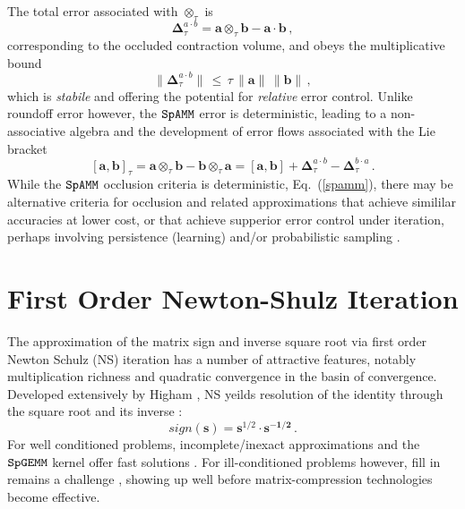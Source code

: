 \documentclass[letterpaper,twocolumn,amsmath,amsfont,amssymb,english,aps,jcp,preprintnumbers,groupaddress,nofootinbib,tightenlines]{revtex4}
\newcommand{\mat}[1]{\boldsymbol{#1}}
\newcommand{\ot}{ {\scriptstyle \otimes}_{ \tau } }
\begin{document}
The total error associated with $\ot$ is 
\begin{equation}
\mat{\Delta}^{a\cdot b}_{\tau}=\mat{a} \ot \mat{b}-\mat{a}\cdot \mat{b} \, ,
\end{equation}
corresponding to the occluded contraction volume, and obeys the multiplicative bound 
\begin{equation}
\lVert \mat{\Delta}^{a \cdot b}_{\tau} \rVert \, \leq \, \tau \, \lVert \mat{a} \rVert  \,  \lVert \mat{b} \rVert \, ,
\end{equation}
which is {\em stabile} \cite{DemmelnHolz2007} and offering the potential for {\em relative} error control.
Unlike roundoff error however, the $\tt SpAMM$ error is deterministic,
leading to a non-associative algebra and the development of error flows associated with the Lie bracket
\begin{equation}
\left[ \mat{a} , \mat{b} \right]_{\tau} = \mat{a} \ot \mat{b}-\mat{b} \ot \mat{a}  
=  \left[ \mat{a} , \mat{b} \right]
+ \mat{\Delta}^{a\cdot b}_{\tau} -\mat{\Delta}^{b\cdot a}_{\tau} \,.
\end{equation}
While the $\tt SpAMM$ occlusion criteria is deterministic, Eq.~(\ref{spamm}), 
there may be alternative criteria for occlusion and related approximations that 
achieve simililar accuracies at lower cost, or that achieve supperior error control under iteration, 
perhaps involving persistence (learning) and/or probabilistic sampling \cite{Drineas}.  

\pagebreak

\section{First Order Newton-Shulz Iteration}

The approximation of the matrix sign and inverse square root via first order Newton Schulz (NS) iteration 
has a number of attractive features, notably multiplication richness and quadratic convergence in the basin of convergence. 
Developed extensively by Higham \cite{}, NS  yeilds resolution of the identity through the square root and its inverse \cite{}:
\begin{equation}
sign \left( \mat{s} \right) =\mat{s}^{1/2} \cdot \mat{s^{-1/2}} \, .
\end{equation}
For well conditioned problems, incomplete/inexact approximations and the $\tt SpGEMM$ kernel offer fast solutions \cite{}.
For ill-conditioned problems however, fill in remains a challenge \cite{}, showing up well before matrix-compression 
technologies become effective.   
\end{document}
